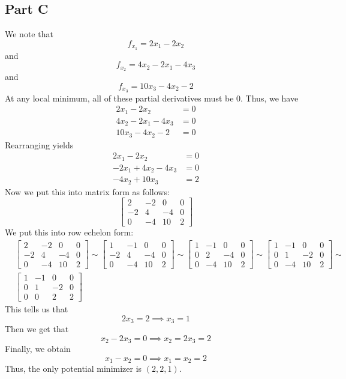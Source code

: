 \documentclass[12pt]{article}
\begin{document}
\subsection*{Part C}
We note that
\[
f_{x_1} = 2x_1 - 2x_2
\] and
\[
f_{x_2} = 4x_2 - 2x_1 - 4x_3
\] and
\[
f_{x_3} = 10x_3 - 4x_2 - 2
\] At any local minimum, all of these partial derivatives must be $0$. Thus, we have
\begin{align*}
2x_1 - 2x_2 &= 0\\
4x_2 - 2x_1 - 4x_3 &= 0\\
10x_3 - 4x_2 - 2 &= 0
\end{align*} Rearranging yields
\begin{align*}
2x_1 - 2x_2 &= 0\\
-2x_1 + 4x_2 - 4x_3 &= 0\\
-4x_2 + 10x_3 &= 2
\end{align*} Now we put this into matrix form as follows:
\[
\begin{bmatrix}
2 & -2 & 0 & 0\\
-2 & 4 & -4 & 0\\
0 & -4 & 10 & 2
\end{bmatrix} 
\] We put this into row echelon form:
\begin{align*} 
&\begin{bmatrix}
2 & -2 & 0 & 0\\
-2 & 4 & -4 & 0\\
0 & -4 & 10 & 2
\end{bmatrix} \sim
\begin{bmatrix}
1 & -1 & 0 & 0\\
-2 & 4 & -4 & 0\\
0 & -4 & 10 & 2
\end{bmatrix} \sim
\begin{bmatrix}
1 & -1 & 0 & 0\\
0 & 2 & -4 & 0\\
0 & -4 & 10 & 2
\end{bmatrix}  \sim 
\begin{bmatrix}
1 & -1 & 0 & 0\\
0 & 1 & -2 & 0\\
0 & -4 & 10 & 2
\end{bmatrix} \sim \\
& \begin{bmatrix}
1 & -1 & 0 & 0\\
0 & 1 & -2 & 0\\
0 & 0 & 2 & 2
\end{bmatrix}
\end{align*} This tells us that
\[
2x_3 = 2 \implies x_3 = 1
\] Then we get that
\[
x_2 - 2x_3 = 0 \implies x_2 = 2x_3 = 2
\] Finally, we obtain
\[
x_1 - x_2= 0 \implies x_1 = x_2 = 2
\] Thus, the only potential minimizer is $(2,2,1)$.
\newpage
\end{document}

